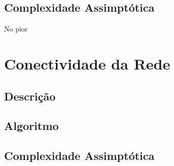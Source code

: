 \documentclass[12pt,a4paper]{scrartcl}
\begin{document}
\subsection{Complexidade Assimptótica}

No pior

\section{Conectividade da Rede}

\subsection{Descrição}

\subsection{Algoritmo}

\subsection{Complexidade Assimptótica}
\end{document}
